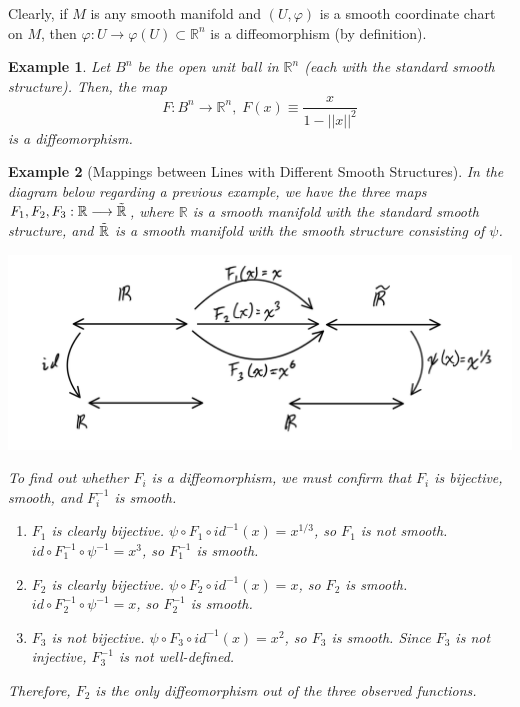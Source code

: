 \documentclass{article}
\newtheorem{example}{Example}[section]
\theoremstyle{remark}
\theoremstyle{definition}
\begin{document}
Clearly, if $M$ is any smooth manifold and $(U, \varphi)$ is a smooth coordinate chart on $M$, then $\varphi: U \longrightarrow \varphi(U) \subset \mathbb{R}^n$ is a diffeomorphism (by definition). 

\begin{example}
Let $B^n$ be the open unit ball in $\mathbb{R}^n$ (each with the standard smooth structure). Then, the map 
\[F: B^n \longrightarrow \mathbb{R}^n, \; F(x) \equiv \frac{x}{1 - ||x||^2}\]
is a diffeomorphism. 
\end{example}

\begin{example}[Mappings between Lines with Different Smooth Structures]
In the diagram below regarding a previous example, we have the three maps $F_1, F_2, F_3: \mathbb{R} \longrightarrow \Tilde{\mathbb{R}}$, where $\mathbb{R}$ is a smooth manifold with the standard smooth structure, and $\Tilde{\mathbb{R}}$ is a smooth manifold with the smooth structure consisting of $\psi$. 
\begin{center}
    \includegraphics[scale=0.25]{img/Real_Line_Manifold_Functions.PNG}
\end{center}
To find out whether $F_i$ is a diffeomorphism, we must confirm that $F_i$ is bijective, smooth, and $F_i^{-1}$ is smooth. 
\begin{enumerate}
    \item $F_1$ is clearly bijective. $\psi \circ F_1 \circ id^{-1} (x) = x^{1/3}$, so $F_1$ is not smooth. $id \circ F_1^{-1} \circ \psi^{-1} = x^3$, so $F_1^{-1}$ is smooth. 
    \item $F_2$ is clearly bijective. $\psi \circ F_2 \circ id^{-1} (x) = x$, so $F_2$ is smooth. $id \circ F_2^{-1} \circ \psi^{-1} = x$, so $F_2^{-1}$ is smooth.
    \item $F_3$ is not bijective. $\psi \circ F_3 \circ id^{-1} (x) = x^2$, so $F_3$ is smooth. Since $F_3$ is not injective, $F_3^{-1}$ is not well-defined. 
\end{enumerate}
Therefore, $F_2$ is the only diffeomorphism out of the three observed functions. 
\end{example}
\end{document}
